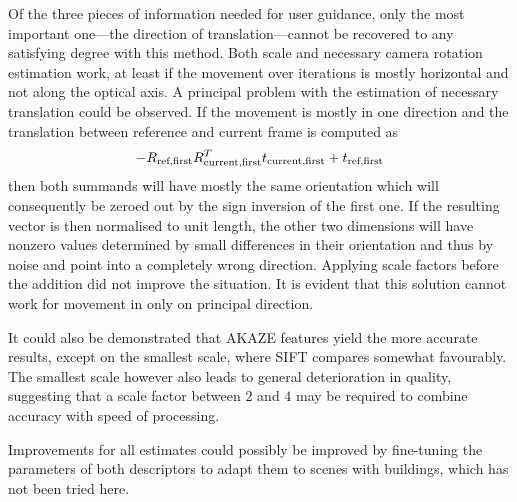 Of the three pieces of information needed for user guidance, only the most
important one---the direction of translation---cannot be recovered to any
satisfying degree with this method. Both scale and necessary camera
rotation estimation work, at least if the movement over iterations is mostly
horizontal and not along the optical axis. A principal problem with the
estimation of necessary translation could be observed. If the movement is mostly
in one direction and the translation between reference and current frame is computed as
\begin{equation*}
   -R_{\text{ref,first}}R^T_{\text{current,first}}t_{\text{current,first}} + t_{\text{ref,first}}
\end{equation*}
then both summands will have mostly the same orientation which will consequently
be zeroed out by the sign inversion of the first one. If the resulting vector is
then normalised to unit length, the other two dimensions will have nonzero
values determined by small differences in their orientation and thus by noise
and point into a completely wrong direction. Applying scale factors before the
addition did not improve the situation. It is evident that this solution cannot
work for movement in only on principal direction.

It could also be demonstrated that AKAZE features yield the more accurate
results, except on the smallest scale, where SIFT compares somewhat favourably.
The smallest scale however also leads to general deterioration in quality,
suggesting that a scale factor between $2$ and $4$ may be required to combine accuracy
with speed of processing.

Improvements for all estimates could possibly be improved by fine-tuning the
parameters of both descriptors to adapt them to scenes with buildings, which has
not been tried here.
